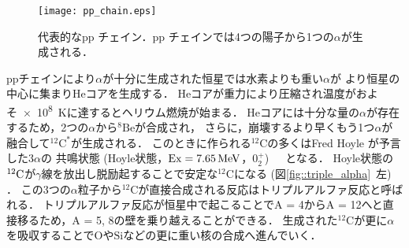 \documentclass[../master]{subfiles}
\begin{document}
\begin{figure}
  \centering
  \texttt{[image: pp\_chain.eps]}
  \caption{代表的なpp チェイン．pp チェインでは4つの陽子から1つの$\alpha$が生成される．}
  \label{fig::pp_chain}
\end{figure}%

ppチェインにより$\alpha$が十分に生成された恒星では水素よりも重い$\alpha$が
より恒星の中心に集まり$\mathrm{He}$コアを生成する．
$\mathrm{He}$コアが重力により圧縮され温度がおよそ\SI{e8}{\kelvin}に達するとヘリウム燃焼が始まる．
$\mathrm{He}$コアには十分な量の$\alpha$が存在するため，2つの$\alpha$から${}^{8}\mathrm{Be}$が合成され，
さらに，崩壊するより早くもう1つ$\alpha$が融合して${}^{12}\mathrm{C}^{*}$が生成される．
このときに作られる${}^{12}\mathrm{C}$の多くはFred Hoyle が予言した$3\alpha$の
共鳴状態 (Hoyle状態，${\rm Ex} = \SI{7.65}{\mega\electronvolt}$，$0_{2}^{+}$)~\cite{hoyle_state}　となる．
Hoyle状態の${}^{12}{\rm C}$が$\gamma$線を放出し脱励起することで安定な${}^{12}\mathrm{C}$になる
 (図\ref{fig::triple_alpha}~左) ．
この3つの$\alpha$粒子から${}^{12}\mathrm{C}$が直接合成される反応はトリプルアルファ反応と呼ばれる．
トリプルアルファ反応が恒星中で起こることでA = 4からA = 12へと直接移るため，A = 5, 8の壁を乗り越えることができる．
生成された${}^{12}\mathrm{C}$が更に$\alpha$を吸収することで$\mathrm{O}$や$\mathrm{Si}$などの更に重い核の合成へ進んでいく．
\end{document}
